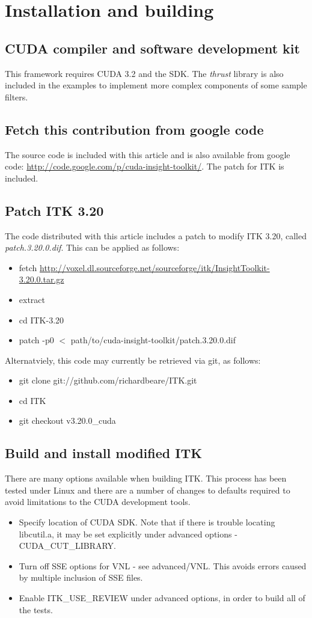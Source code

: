 \documentclass{InsightArticle}
\begin{document}
\section{Installation and building}
\subsection{CUDA compiler and software development kit}
This framework requires CUDA 3.2 and the SDK. The {\em thrust} library
is also included in the examples to implement more complex components
of some sample filters.
\subsection{Fetch this contribution from google code}
The source code is included with this article and is also available from google code:
\url{http://code.google.com/p/cuda-insight-toolkit/}. The patch for ITK is included.

\subsection{Patch ITK 3.20}
The code distributed with this article includes a patch to modify ITK
3.20, called {\em patch.3.20.0.dif}. This can be applied as follows:

\begin{itemize}
\item fetch \url{http://voxel.dl.sourceforge.net/sourceforge/itk/InsightToolkit-3.20.0.tar.gz}
\item extract
\item cd ITK-3.20
\item patch -p0 $<$ path/to/cuda-insight-toolkit/patch.3.20.0.dif
\end{itemize}

Alternatviely, this code may currently be retrieved via git, as follows:
\begin{itemize}
\item git clone git://github.com/richardbeare/ITK.git
\item cd ITK
\item git checkout v3.20.0\_cuda
\end{itemize}

\subsection{Build and install modified ITK}
There are many options available when building ITK. This process has
been tested under Linux and there are a number of changes to defaults
required to avoid limitations to the CUDA development tools.
\begin{itemize}
  \item Specify location of CUDA SDK. Note that if there is trouble locating libcutil.a, it may be set explicitly under advanced options - CUDA\_CUT\_LIBRARY.
  \item Turn off SSE options for VNL - see advanced/VNL. This avoids errors caused by multiple inclusion of SSE files.
  \item Enable ITK\_USE\_REVIEW under advanced options, in order to build all of the tests.
\end{itemize}
\end{document}
